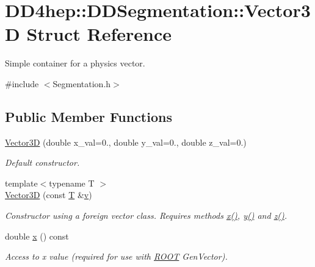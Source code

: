 \hypertarget{struct_d_d4hep_1_1_d_d_segmentation_1_1_vector3_d}{
\section{DD4hep::DDSegmentation::Vector3D Struct Reference}
\label{struct_d_d4hep_1_1_d_d_segmentation_1_1_vector3_d}
}


Simple container for a physics vector.  


{\ttfamily \#include $<$Segmentation.h$>$}\subsection*{Public Member Functions}
\begin{DoxyCompactItemize}
\item 
\hyperlink{struct_d_d4hep_1_1_d_d_segmentation_1_1_vector3_d_a2b4422ed26bde66eeaac8bc46db07280}{Vector3D} (double x\_\-val=0., double y\_\-val=0., double z\_\-val=0.)
\begin{DoxyCompactList}\small\item\em Default constructor. \item\end{DoxyCompactList}\item 
{\footnotesize template$<$typename T $>$ }\\\hyperlink{struct_d_d4hep_1_1_d_d_segmentation_1_1_vector3_d_ab9ae20339fc5ed846ac128fe2a2d7965}{Vector3D} (const \hyperlink{class_t}{T} \&\hyperlink{_multi_view_8cpp_a8320ee13ac034dbf6d624fe8953dd337}{v})
\begin{DoxyCompactList}\small\item\em Constructor using a foreign vector class. Requires methods \hyperlink{struct_d_d4hep_1_1_d_d_segmentation_1_1_vector3_d_a12a06ce31d8ebe61ef30183e16d88b6a}{x()}, \hyperlink{struct_d_d4hep_1_1_d_d_segmentation_1_1_vector3_d_a315b5dbb6abf747eac4a0432826b482f}{y()} and \hyperlink{struct_d_d4hep_1_1_d_d_segmentation_1_1_vector3_d_ab30126e2b17eeb8638b4c5ebbb1b5278}{z()}. \item\end{DoxyCompactList}\item 
double \hyperlink{struct_d_d4hep_1_1_d_d_segmentation_1_1_vector3_d_a12a06ce31d8ebe61ef30183e16d88b6a}{x} () const 
\begin{DoxyCompactList}\small\item\em Access to x value (required for use with \hyperlink{namespace_r_o_o_t}{ROOT} GenVector). \item\end{DoxyCompactList}\item 

\end{DoxyCompactItemize}

